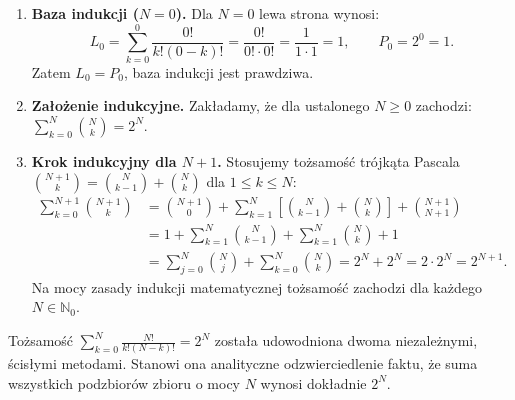 \begin{enumerate}[label=\textbf{Krok \arabic*.},leftmargin=*]
    \item \textbf{Baza indukcji ($N = 0$).}
    Dla $N = 0$ lewa strona wynosi:
    \begin{equation*}
        L_0 = \sum_{k=0}^{0} \frac{0!}{k!(0-k)!} = \frac{0!}{0! \cdot 0!} = \frac{1}{1 \cdot 1} = 1, \qquad P_0 = 2^0 = 1.
    \end{equation*}
    Zatem $L_0 = P_0$, baza indukcji jest prawdziwa.

    \item \textbf{Założenie indukcyjne.}
    Zakładamy, że dla ustalonego $N \geqslant 0$ zachodzi: $\sum_{k=0}^{N} \binom{N}{k} = 2^N$.

    \item \textbf{Krok indukcyjny dla $N + 1$.}
    Stosujemy tożsamość trójkąta Pascala $\binom{N+1}{k} = \binom{N}{k-1} + \binom{N}{k}$ dla $1 \leqslant k \leqslant N$:
    \begin{align*}
        \sum_{k=0}^{N+1} \binom{N+1}{k} &= \binom{N+1}{0} + \sum_{k=1}^{N} \left[ \binom{N}{k-1} + \binom{N}{k} \right] + \binom{N+1}{N+1} \\
        &= 1 + \sum_{k=1}^{N} \binom{N}{k-1} + \sum_{k=1}^{N} \binom{N}{k} + 1 \\
        &= \sum_{j=0}^{N} \binom{N}{j} + \sum_{k=0}^{N} \binom{N}{k} = 2^N + 2^N = 2 \cdot 2^N = 2^{N+1}.
    \end{align*}
    Na mocy zasady indukcji matematycznej tożsamość zachodzi dla każdego $N \in \mathbb{N}_0$.
\end{enumerate}

\vspace{0.2cm}

\begin{odpowiedzbox}
Tożsamość $\displaystyle\sum_{k=0}^{N} \frac{N!}{k!(N-k)!} = 2^N$ została udowodniona dwoma niezależnymi, ścisłymi metodami. Stanowi ona analityczne odzwierciedlenie faktu, że suma wszystkich podzbiorów zbioru o mocy $N$ wynosi dokładnie $2^N$.
\end{odpowiedzbox}
